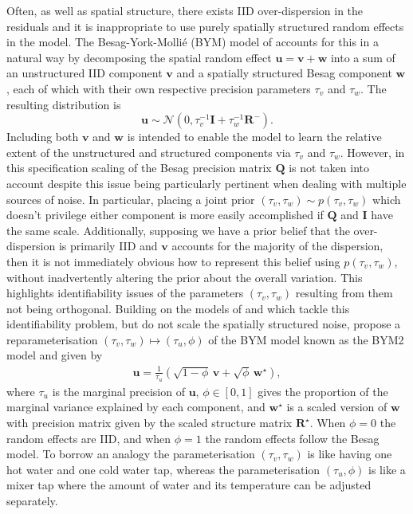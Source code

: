 \documentclass[a4paper, nobind]{templates/ociamthesis}
\begin{document}
Often, as well as spatial structure, there exists IID over-dispersion in the residuals and it is inappropriate to use purely spatially structured random effects in the model.
The Besag-York-Mollié (BYM) model of \textcite{besag1991bayesian} accounts for this in a natural way by decomposing the spatial random effect \(\mathbf{u} = \mathbf{v} + \mathbf{w}\) into a sum of an unstructured IID component \(\mathbf{v}\) and a spatially structured Besag component \(\mathbf{w}\), each of which with their own respective precision parameters \(\tau_v\) and \(\tau_w\).
The resulting distribution is
\begin{equation}
    \mathbf{u} \sim \mathcal{N}(0, \tau_v^{-1} \mathbf{I} + \tau_w^{-1} \mathbf{R}^{-}) \label{eq:bym}.
\end{equation}
Including both \(\mathbf{v}\) and \(\mathbf{w}\) is intended to enable the model to learn the relative extent of the unstructured and structured components via \(\tau_v\) and \(\tau_w\).
However, in this specification scaling of the Besag precision matrix \(\mathbf{Q}\) is not taken into account despite this issue being particularly pertinent when dealing with multiple sources of noise.
In particular, placing a joint prior \((\tau_v, \tau_w) \sim p(\tau_v, \tau_w)\) which doesn't privilege either component is more easily accomplished if \(\mathbf{Q}\) and \(\mathbf{I}\) have the same scale.
Additionally, supposing we have a prior belief that the over-dispersion is primarily IID and \(\mathbf{v}\) accounts for the majority of the dispersion, then it is not immediately obvious how to represent this belief using \(p(\tau_v, \tau_w)\), without inadvertently altering the prior about the overall variation.
This highlights identifiability issues of the parameters \((\tau_v, \tau_w)\) resulting from them not being orthogonal.
Building on the models of \textcite{leroux2000estimation} and \textcite{dean2001detecting} which tackle this identifiability problem, but do not scale the spatially structured noise, \textcite{simpson2017penalising} propose a reparameterisation \((\tau_v, \tau_w) \mapsto (\tau_u, \phi)\) of the BYM model known as the BYM2 model and given by
\begin{align}
\mathbf{u} = \frac{1}{\tau_u} \left( \sqrt{1- \phi} \, \mathbf{v} + \sqrt{\phi} \, \mathbf{w}^\star \right), \label{eq:bym2}
\end{align}
where \(\tau_u\) is the marginal precision of \(\mathbf{u}\), \(\phi \in [0, 1]\) gives the proportion of the marginal variance explained by each component, and \(\mathbf{w}^\star\) is a scaled version of \(\mathbf{w}\) with precision matrix given by the scaled structure matrix \(\mathbf{R}^\star\).
When \(\phi = 0\) the random effects are IID, and when \(\phi = 1\) the random effects follow the Besag model.
To borrow an analogy \autocite{rue2020comment} the parameterisation \((\tau_v, \tau_w)\) is like having one hot water and one cold water tap, whereas the parameterisation \((\tau_u, \phi)\) is like a mixer tap where the amount of water and its temperature can be adjusted separately.
\end{document}
